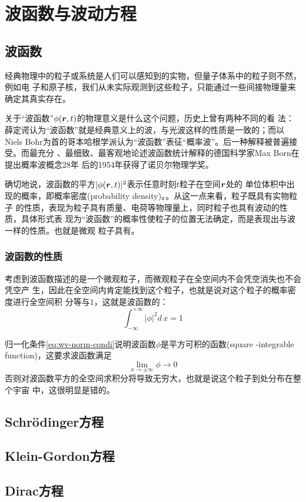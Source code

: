 \chapter{波函数与波动方程}

\section{波函数}
经典物理中的粒子或系统是人们可以感知到的实物，但量子体系中的粒子则不然，例如电
子和原子核，我们从未实际观测到这些粒子，只能通过一些间接物理量来确定其真实存在。

关于“波函数”$\phi(\bm{r}, t)$的物理意义是什么这个问题，历史上曾有两种不同的看
法：薛定谔认为“波函数”就是经典意义上的波，与光波这样的性质是一致的；而以Niels 
Bohr为首的哥本哈根学派认为“波函数”表征“概率波”。后一种解释被普遍接受。而最充分
、最细致、最客观地论述波函数统计解释的德国科学家Max Born在提出概率波概念28年
后的1954年获得了诺贝尔物理学奖。

确切地说，波函数的平方$|\phi(\bm{r}, t)|^2$表示任意时刻$t$粒子在空间$\bm{r}$处的
单位体积中出现的概率，即概率密度(probability density)。。从这一点来看，粒子既具有实物粒子
的性质，表现为粒子具有质量、电荷等物理量上，同时粒子也具有波动的性质，具体形式表
现为“波函数”的概率性使粒子的位置无法确定，而是表现出与波一样的性质。也就是微观
粒子具有。

\subsection{波函数的性质}
考虑到波函数描述的是一个微观粒子，而微观粒子在全空间内不会凭空消失也不会凭空产
生，因此在全空间内肯定能找到这个粒子，也就是说对这个粒子的概率密度进行全空间积
分等与$1$，这就是波函数的：
\begin{equation}
    \int_{-\infty}^{+\infty} | \phi | ^2 d\,x = 1
    \label{eq:wv-norm-condi}
\end{equation}

归一化条件\eqref{eq:wv-norm-condi}说明波函数$\phi$是平方可积的函数(square
-integrable function)，这要求波函数满足
\begin{equation}
    \lim_{x \to \pm \infty} \phi \to 0
    \label{eq:wave-}
\end{equation}
否则对波函数平方的全空间求积分将导致无穷大，也就是说这个粒子到处分布在整个宇宙
中，这很明显是错的。

\section{Schr{\"o}dinger方程}
\section{Klein-Gordon方程}
\section{Dirac方程}